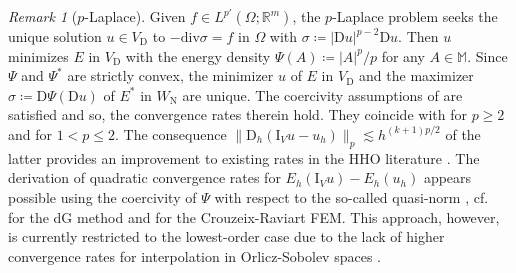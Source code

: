 \documentclass[a4paper]{amsart}
\numberwithin{equation}{section}
\newcommand{\R}{\mathbb{R}}
\renewcommand{\div}{\mathrm{div}}
\newcommand{\I}{\mathrm{I}}
\newcommand{\D}{\mathrm{D}}
\newcommand{\M}{\mathbb{M}}
\theoremstyle{remark}
\newtheorem{remark}[theorem]{Remark}
\begin{document}
\begin{remark}[$p$-Laplace]\label{rem:p-Laplace}
	Given $f \in L^{p'}(\Omega;\R^m)$, the $p$-Laplace problem seeks the unique solution $u \in V_\mathrm{D}$ to
	$- \div \sigma = f$ in $\Omega$ with $\sigma \coloneqq |\D u|^{p-2} \D u$.
	Then $u$ minimizes $E$ in $V_\mathrm{D}$ with the energy density $\Psi(A) \coloneqq |A|^p/p$ for any $A \in \M$.
	Since $\Psi$ and $\Psi^*$ are strictly convex, the minimizer $u$ of $E$ in $V_\mathrm{D}$ and the maximizer $\sigma \coloneqq \D \Psi (\D u)$ of $E^*$ in $W_\mathrm{N}$ are unique.
	The coercivity assumptions of  are satisfied and so, the convergence rates therein hold. They coincide with \cite{GlowinskiMarrocco1975} for $p \geq 2$ and \cite{Tyukhtin1982,Chow1989} for $1 < p \leq 2$.
	The consequence $\|\D_h (\I_V u - u_h)\|_p \lesssim h^{(k+1)p/2}$ of the latter provides an improvement to existing rates in the HHO literature \cite{CarstensenTran2021,DiPietroDroniou2021}.
	The derivation of quadratic convergence rates for $E_h(\I_V u) - E_h(u_h)$
	appears possible using the coercivity of $\Psi$ with respect to the so-called quasi-norm \cite{BarrettLiu1993,DieningKreuzer2008}, cf.~\cite{DieningKoenerRuzickaToulopoulos2014} for the dG method and \cite{Bartels2021b,kaltenbach2022} for the Crouzeix-Raviart FEM.
	This approach, however, is currently restricted to the lowest-order case due to the lack of higher convergence rates for interpolation in Orlicz-Sobolev spaces \cite{DieningRuzicka2007}.
\end{remark}
\end{document}
